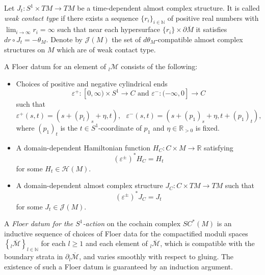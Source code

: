 \documentclass[a4paper]{article}
\numberwithin{equation}{section}
\begin{document}
Let $J_t:S^1\times\mathit{TM}\rightarrow\mathit{TM}$ be a time-dependent almost complex structure. It is called \textit{weak contact type} if there exists a sequence $\{r_i\}_{i\in\mathbb{N}}$ of positive real numbers with $\lim_{i\rightarrow\infty}r_i=\infty$ such that near each hypersurface $\{r_i\}\times\partial\overline{M}$ it satisfies $dr\circ J_t=-\theta_M$. Denote by $\mathcal{J}(M)$ the set of $d\theta_M$-compatible almost complex structures on $M$ which are of weak contact type.

A Floer datum for an element of ${}_l\mathcal{M}$ consists of the following:
\begin{itemize}
	\item Choices of positive and negative cylindrical ends
	\begin{equation}
	\varepsilon^+:[0,\infty)\times S^1\rightarrow C\textrm{ and }\varepsilon^-:(-\infty,0]\rightarrow C
	\end{equation}
    such that
    \begin{equation}
    \varepsilon^+(s,t)=(s+(p_l)_s+\eta,t),\textrm{ }\varepsilon^-(s,t)=(s+(p_1)_s+\eta,t+(p_1)_t),
    \end{equation}
    where $(p_1)_t$ is the $t\in S^1$-coordinate of $p_1$ and $\eta\in\mathbb{R}_{>0}$ is fixed.
    \item A domain-dependent Hamiltonian function $H_C:C\times M\rightarrow\mathbb{R}$ satisfying
    \begin{equation}
    (\varepsilon^\pm)^\ast H_C=H_t
    \end{equation}
    for some $H_t\in\mathcal{H}(M)$.
    \item A domain-dependent almost complex structure $J_C:C\times\mathit{TM}\rightarrow\mathit{TM}$ such that
    \begin{equation}
    (\varepsilon^\pm)^\ast J_C=J_t
    \end{equation}
    for some $J_t\in\mathcal{J}(M)$.
\end{itemize}

A \textit{Floer datum for the $S^1$-action} on the cochain complex $\mathit{SC}^\ast(M)$ is an inductive sequence of choices of Floer data for the compactified moduli spaces $\left\{{}_l\overline{\mathcal{M}}\right\}_{l\in\mathbb{N}}$ for each $l\geq 1$ and each element of ${}_l\overline{\mathcal{M}}$, which is compatible with the boundary strata in $\partial{}_l\overline{\mathcal{M}}$, and varies smoothly with respect to gluing. The existence of such a Floer datum is guaranteed by an induction argument. 
\end{document}
